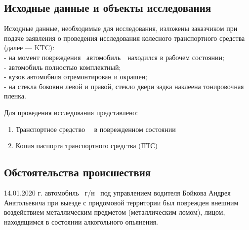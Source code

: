 \setcounter{page}{1}





\subsection{Исходные данные и объекты исследования} 
Исходные  данные,  необходимые  для   исследования,  изложены   заказчиком при подаче заявления о проведения исследования   колесного  транспортного  средства (далее —  KTC):\\
- на момент повреждения \, автомобиль \,\, находился в рабочем состоянии;\\
- автомобиль полностью комплектный;\\
- кузов автомобиля  отремонтирован и окрашен;\\
- на стекла боковин левой и правой, стекло двери задка наклеена тонировочная пленка.   

	Для проведения исследования представлено:\\
\begin{enumerate}
\item Транспортное средство \,  \, в поврежденном состоянии
\item Копия паспорта транспортного средства (ПТС) 
	\end{enumerate}
%
\subsection*{Обстоятельства происшествия}
14.01.2020 г. автомобиль  \, г/н \, под управлением водителя Бойкова Андрея Анатольевича  при выезде с придомовой территории был поврежден внешним воздействием металлическим предметом (металлическим ломом), лицом, находящимся в состоянии алкогольного опьянения.
%
%
